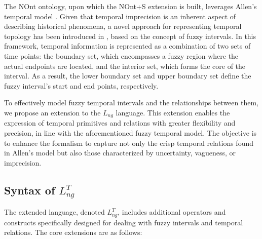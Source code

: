 The NOnt ontology, upon which the NOnt+S extension is built, leverages Allen's temporal model \cite{batsakisTemporalRepresentationReasoning2016}. Given that temporal imprecision is an inherent aspect of describing historical phenomena, a novel approach for representing temporal topology has been introduced in \cite{papadakisTemporalPrimitivesAlternative2015}, based on the concept of fuzzy intervals. In this framework, temporal information is represented as a combination of two sets of time points: the boundary set, which encompasses a fuzzy region where the actual endpoints are located, and the interior set, which forms the core of the interval. As a result, the lower boundary set and upper boundary set define the fuzzy interval’s start and end points, respectively.

To effectively model fuzzy temporal intervals and the relationships between them, we propose an extension to the \( L_{ng} \) language. This extension enables the expression of temporal primitives and relations with greater flexibility and precision, in line with the aforementioned fuzzy temporal model. The objective is to enhance the formalism to capture not only the crisp temporal relations found in Allen's model but also those characterized by uncertainty, vagueness, or imprecision.

\subsection{Syntax of \( L_{ng}^T \)}\label{V-subsec:lngt}

The extended language, denoted \( L_{ng}^T \), includes additional operators and constructs specifically designed for dealing with fuzzy intervals and temporal relations. The core extensions are as follows:

